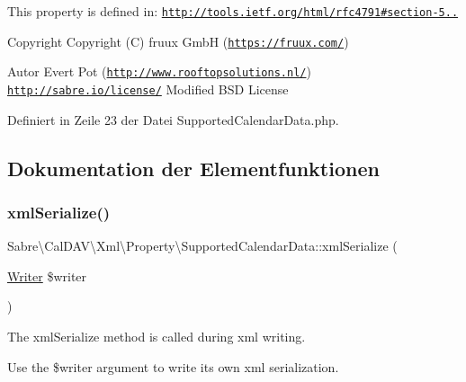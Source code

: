 This property is defined in\+: \href{http://tools.ietf.org/html/rfc4791#section-5.2.4}{\tt http\+://tools.\+ietf.\+org/html/rfc4791\#section-\/5..}

\begin{DoxyCopyright}{Copyright}
Copyright (C) fruux GmbH (\href{https://fruux.com/}{\tt https\+://fruux.\+com/}) 
\end{DoxyCopyright}
\begin{DoxyAuthor}{Autor}
Evert Pot (\href{http://www.rooftopsolutions.nl/}{\tt http\+://www.\+rooftopsolutions.\+nl/})  \href{http://sabre.io/license/}{\tt http\+://sabre.\+io/license/} Modified B\+SD License 
\end{DoxyAuthor}


Definiert in Zeile 23 der Datei Supported\+Calendar\+Data.\+php.



\subsection{Dokumentation der Elementfunktionen}
\mbox{\label{class_sabre_1_1_cal_d_a_v_1_1_xml_1_1_property_1_1_supported_calendar_data_a4458e6241019a0b31e1c81b76cf5d740}} 
\subsubsection{\texorpdfstring{xml\+Serialize()}{xmlSerialize()}}
{\footnotesize\ttfamily Sabre\textbackslash{}\+Cal\+D\+A\+V\textbackslash{}\+Xml\textbackslash{}\+Property\textbackslash{}\+Supported\+Calendar\+Data\+::xml\+Serialize (\begin{DoxyParamCaption}\item[{\mbox{\hyperlink{class_sabre_1_1_xml_1_1_writer}{Writer}}}]{\$writer }\end{DoxyParamCaption})}

The xml\+Serialize method is called during xml writing.

Use the \$writer argument to write its own xml serialization.

